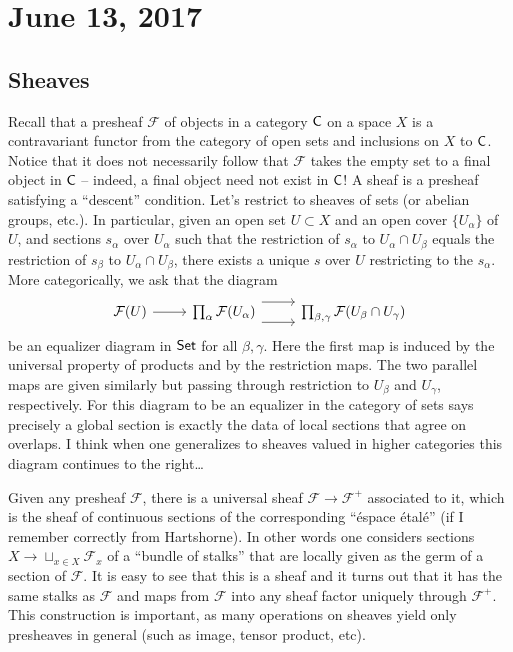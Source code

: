 \documentclass{amsart}
\begin{document}
\section{June 13, 2017}

\subsection{Sheaves}
Recall that a presheaf $\mathcal{F}$ of objects in a category $\sf C$ on a space
$X$ is a contravariant functor
from the category of open sets and inclusions on $X$ to $\sf C$.
Notice that it does not necessarily follow that $\mathcal{F}$ takes the empty
set to a final object in $\sf C$ -- indeed, a final object need not exist in
$\sf C$!
A sheaf is a presheaf satisfying a ``descent'' condition. Let's restrict to sheaves
of sets (or abelian groups, etc.).
In particular, given an open set $U\subset X$ and an open cover $\{U_\alpha\}$ of $U$,
and sections $s_\alpha$ over $U_\alpha$ such that the restriction of $s_\alpha$ to
$U_\alpha\cap U_\beta$ equals the restriction of $s_\beta$ to $U_\alpha\cap U_\beta$,
there exists a unique $s$ over $U$ restricting to the $s_\alpha$.
More categorically, we ask that the diagram
\begin{equation*}
    \begin{tikzcd}
        \mathcal{F}(U) \rar & \prod_\alpha \mathcal{F}(U_\alpha)
        \rar[shift left=3] \rar[shift right=3] & \prod_{\beta,\gamma}\mathcal{F}(U_\beta\cap U_\gamma)
    \end{tikzcd}
\end{equation*}
be an equalizer diagram in $\sf Set$ for all $\beta,\gamma$. Here the first map
is induced by the universal property of products and by the restriction maps. The
two parallel maps are given similarly but passing through restriction to $U_\beta$
and $U_\gamma$, respectively. For this diagram to be an equalizer in the category
of sets says precisely a global section is exactly the data of local sections that
agree on overlaps. I think when one generalizes to sheaves valued in higher categories
this diagram continues to the right\ldots

Given any presheaf $\mathcal{F}$, there is a universal sheaf
$\mathcal{F}\to \mathcal{F}^+$ associated to it, which is the sheaf of continuous
sections of the corresponding ``\'espace \'etal\'e'' (if I remember correctly from
Hartshorne). In other words one considers sections $X\to\sqcup_{x\in X}\mathcal{F}_x$
of a ``bundle of stalks'' that are locally given as the germ of a section of $\mathcal{F}$.
It is easy to see that this is a sheaf and it turns out that it has the same stalks
as $\mathcal{F}$ and maps from $\mathcal{F}$ into any sheaf factor uniquely through
$\mathcal{F}^+$. This construction is important, as many operations on sheaves
yield only presheaves in general (such as image, tensor product, etc).
\end{document}
